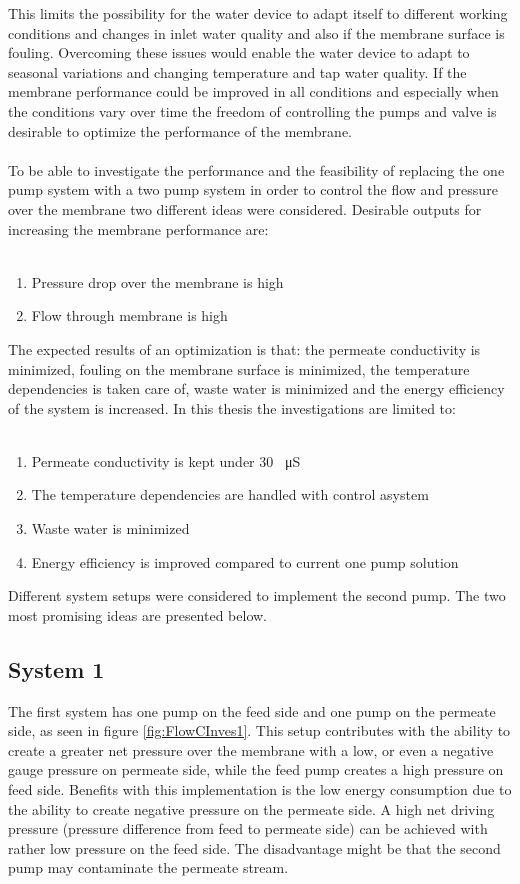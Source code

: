 This limits the possibility for the water device to adapt itself to different working conditions and changes in inlet water quality and also if the membrane surface is fouling. Overcoming these issues would enable the water device to adapt to seasonal variations and changing temperature and tap water quality. If the membrane performance could be improved in all conditions and especially when the conditions vary over time the freedom of controlling the pumps and valve is desirable to optimize the performance of the membrane. \\
\\
To be able to investigate the performance and the feasibility of replacing the one pump system with a two pump system in order to control the flow and pressure over the membrane two different ideas were considered. Desirable outputs for increasing the membrane performance are:\\
\\
\begin{enumerate}
\item Pressure drop over the membrane is high
\item Flow through membrane is high
\end{enumerate}
The expected results of an optimization is that: the permeate conductivity is minimized, fouling on the membrane surface is minimized, the temperature dependencies is taken care of, waste water is minimized and the energy efficiency of the system is increased. In this thesis the investigations are limited to:\\
\\
\begin{enumerate}
\item Permeate conductivity is kept under 30 \SI{}{\micro\siemens}
\item The temperature dependencies are handled with control asystem
\item Waste water is minimized
\item Energy efficiency is improved compared to current one pump solution
\end{enumerate}
Different system setups were considered to implement the second pump. The two most promising ideas are presented below.

\subsection{System 1}
The first system has one pump on the feed side and one pump on the permeate side, as seen in figure \ref{fig:FlowCInves1}. This setup contributes with the ability to create a greater net pressure over the membrane with a low, or even a negative gauge pressure on permeate side, while the feed pump creates a high pressure on feed side. Benefits with this implementation is the low energy consumption due to the ability to create negative pressure on the permeate side. A high net driving pressure (pressure difference from feed to permeate side) can be achieved with rather low pressure on the feed side. The disadvantage might be that the second pump may contaminate the permeate stream. 

